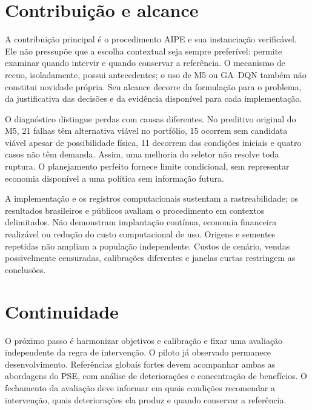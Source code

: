 \section{Contribuição e alcance}
A contribuição principal é o procedimento AIPE e sua instanciação verificável. Ele não pressupõe que a escolha contextual seja sempre preferível: permite examinar quando intervir e quando conservar a referência. O mecanismo de recuo, isoladamente, possui antecedentes; o uso de M5 ou GA--DQN também não constitui novidade própria. Seu alcance decorre da formulação para o problema, da justificativa das decisões e da evidência disponível para cada implementação.

O diagnóstico distingue perdas com causas diferentes. No preditivo original do M5, 21 falhas têm alternativa viável no portfólio, 15 ocorrem sem candidata viável apesar de possibilidade física, 11 decorrem das condições iniciais e quatro casos não têm demanda. Assim, uma melhoria do seletor não resolve toda ruptura. O planejamento perfeito fornece limite condicional, sem representar economia disponível a uma política sem informação futura.

A implementação e os registros computacionais sustentam a rastreabilidade; os resultados brasileiros e públicos avaliam o procedimento em contextos delimitados. Não demonstram implantação contínua, economia financeira realizável ou redução do custo computacional de uso. Origens e sementes repetidas não ampliam a população independente. Custos de cenário, vendas possivelmente censuradas, calibrações diferentes e janelas curtas restringem as conclusões.

\section{Continuidade}
O próximo passo é harmonizar objetivos e calibração e fixar uma avaliação independente da regra de intervenção. O piloto já observado permanece desenvolvimento. Referências globais fortes devem acompanhar ambas as abordagens do PSE, com análise de deteriorações e concentração de benefícios. O fechamento da avaliação deve informar em quais condições recomendar a intervenção, quais deteriorações ela produz e quando conservar a referência.
